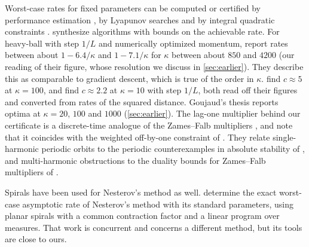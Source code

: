 \documentclass[11pt, a4paper]{article}
\theoremstyle{definition}
\begin{document}
Worst-case rates for fixed parameters can be computed or certified by performance estimation
\citep{drori2014performance,taylor2017smooth}, by Lyapunov searches \citep{taylor2018lyapunov,upadhyaya2023automated}
and by integral quadratic constraints \citep{megretski1997system,lessard2016analysis}. 
synthesize algorithms with bounds on the achievable rate. For heavy-ball with step $1/L$ and numerically optimized
momentum, \citet[Fig.~8]{lessard2016analysis} report rates between about $1-6.4/\kappa$ and $1-7.1/\kappa$ for
$\kappa$ between about $850$ and $4200$ (our reading of their figure, whose resolution we discuss in
\cref{sec:earlier}). They describe this as comparable to gradient
descent, which is true of the order in $\kappa$.  find $c\approx5$ at $\kappa=100$, and
\citet[Fig.~2c]{upadhyaya2023automated} find $c\approx2.2$ at $\kappa=10$ with step $1/L$, both read off their figures and
converted from rates of the squared distance. Goujaud's thesis \citep[Table~10.1]{goujaud2024thesis} reports optima at $\kappa=20$, $100$ and
$1000$ (\cref{sec:earlier}). The lag-one multiplier behind our certificate is a discrete-time analogue of the Zames--Falb multipliers
\citep{zames1968stability}, and
\citet[§1.5]{pasechniuk2026two} note that it coincides with the weighted off-by-one constraint of
\citet{lessard2016analysis}. They relate single-harmonic periodic orbits to the periodic counterexamples in absolute
stability of \citet{seiler2021construction}, and multi-harmonic obstructions to the duality bounds for Zames--Falb
multipliers of \citet{zhang2022duality}.

Spirals have been used for Nesterov's method as well.  determine the exact worst-case asymptotic rate
of Nesterov's method with its standard parameters, using planar spirals with a common contraction factor and a linear
program over measures. That work is concurrent and concerns a different method, but its tools are close to ours.
\end{document}
